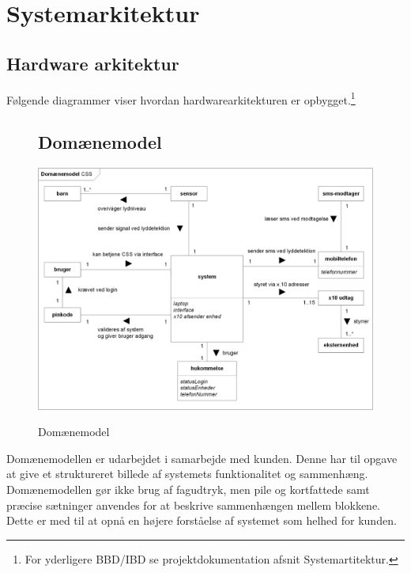 \chapter{Systemarkitektur}

\section{Hardware arkitektur}

Følgende diagrammer viser hvordan hardwarearkitekturen er opbygget.\footnote{For yderligere BBD/IBD se projektdokumentation afsnit Systemartitektur.}

\begin{figure}[htbp] \centering
\section{Domænemodel}
{\includegraphics[width=\textwidth]{billeder/diagrammer/Domain_Model}}
\caption{Domænemodel}
\label{lab:domainmodel}
\end{figure}
Domænemodellen er udarbejdet i samarbejde med kunden. Denne har til opgave at give et struktureret billede af systemets funktionalitet og sammenhæng. Domænemodellen gør ikke brug af fagudtryk, men pile og kortfattede samt præcise sætninger anvendes for at beskrive sammenhængen mellem blokkene. Dette er med til at opnå en højere forståelse af systemet som helhed for kunden.

\newpage

